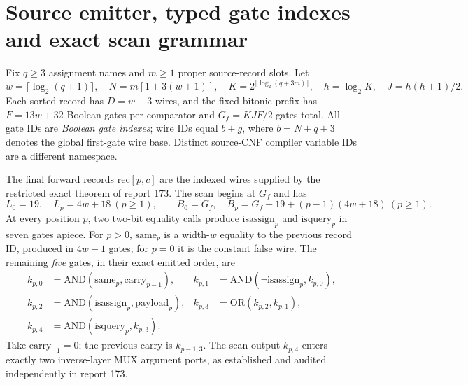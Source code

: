 \documentclass[11pt]{article}
\begin{document}
\section{Source emitter, typed gate indexes and exact scan grammar}
Fix $q\ge3$ assignment names and $m\ge1$ proper source-record slots. Let
\[
w=\lceil\log_2(q+1)\rceil,\quad N=m[1+3(w+1)],\quad
K=2^{\lceil\log_2(q+3m)\rceil},\quad h=\log_2K,\quad J=h(h+1)/2.
\]
Each sorted record has $D=w+3$ wires, and the fixed bitonic prefix has
$F=13w+32$ Boolean gates per comparator and
$G_f=KJ F/2$ gates total. All gate IDs are \emph{Boolean gate indexes}; wire IDs equal $b+g$, where $b=N+q+3$ denotes the global first-gate wire base. Distinct source-CNF compiler variable IDs are a different namespace.

The final forward records $\mathrm{rec}[p,c]$ are the indexed wires supplied by the restricted exact theorem of report 173. The scan begins at $G_f$ and has
\[
 L_0=19,\quad L_p=4w+18\ (p\ge1),\qquad
 B_0=G_f,\quad B_p=G_f+19+(p-1)(4w+18)\ (p\ge1).\tag{1}
\]
At every position $p$, two two-bit equality calls produce $\mathrm{isassign}_p$ and $\mathrm{isquery}_p$ in seven gates apiece. For $p>0$, $\mathrm{same}_p$ is a width-$w$ equality to the previous record ID, produced in $4w-1$ gates; for $p=0$ it is the constant false wire. The remaining \emph{five} gates, in their exact emitted order, are
\begin{align*}
 k_{p,0}&=\mathrm{AND}(\mathrm{same}_p,\mathrm{carry}_{p-1}),
&k_{p,1}&=\mathrm{AND}(\neg\mathrm{isassign}_p,k_{p,0}),\\
 k_{p,2}&=\mathrm{AND}(\mathrm{isassign}_p,\mathrm{payload}_p),
&k_{p,3}&=\mathrm{OR}(k_{p,2},k_{p,1}),\\
 k_{p,4}&=\mathrm{AND}(\mathrm{isquery}_p,k_{p,3}).&& \tag{2}
\end{align*}
Take $\mathrm{carry}_{-1}=0$; the previous carry is $k_{p-1,3}$. The scan-output $k_{p,4}$ enters exactly two inverse-layer MUX argument ports, as established and audited independently in report 173.
\end{document}
